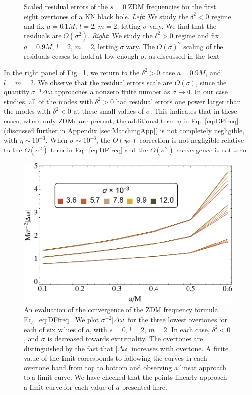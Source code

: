 \begin{refsection}
\begin{figure}[tb]
\vspace{-5mm}
\caption{Scaled residual errors of the $s=0$ ZDM frequencies for the first eight overtones of a KN black hole. 
{\it Left}: We study the $\delta^2<0$ regime and fix $a  = 0.1 M$, $l=2$, $m =2$, letting $\sigma$ vary. We find that the residuals are $O(\sigma^2)$. {\it Right}: We study the $\delta^2>0$ regime and fix $a  = 0.9 M$, $l=2$, $m =2$, letting $\sigma$ vary. The $O(\sigma)^2$ scaling of the residuals ceases to hold at low enough $\sigma$, as discussed in the text.}
\label{fig:DFsigcon}
\end{figure}

In the right panel of Fig.~\ref{fig:DFsigcon}, we return to the $\delta^2 >0$ case $a=0.9 M$, and $l = m =2$. 
We observe that the residual errors scale are $O(\sigma)$, since the quantity $\sigma^{-1}\Delta \omega$ approaches a nonzero finite number as $\sigma \to 0$.  
In our case studies, all of the modes with $\delta^2 >0$ had residual errors one power larger than the modes with $\delta^2 < 0$ at these small values of $\sigma$.
This indicates that in these cases, where only ZDMs are present, the additional term $\eta$ in Eq.~\eqref{eq:DFfreq} (discussed further in Appendix \ref{sec:MatchingApp}) is not completely negligible, with $\eta \sim 10^{-3}$.
When $\sigma \sim 10^{-3}$, the $O(\eta\sigma)$ correction is not negligible relative to the $O(\sigma^2)$ term in  Eq.~\eqref{eq:DFfreq} and the $O(\sigma^2)$ convergence is not seen.

\begin{figure}[tb]
\includegraphics[width =1.0 \columnwidth]{chapter_extremal/etc/sigmaconvergence}
\caption{An evaluation of the convergence of the ZDM frequency formula Eq.~\eqref{eq:DFfreq}. We plot $\sigma^{-2}|\Delta\omega|$ for the three lowest overtones for each of six values of $a$, with $s=0$, $l=2$, $m=2$. In each case, $\delta^2<0$, and $\sigma$ is decreased towards extremality. The overtones are distinguished by the fact that $|\Delta\omega|$ increases with overtone. A finite value of the limit corresponds to following the curves in each overtone band from top to bottom and observing a linear approach to a limit curve. We have checked that the points linearly approach a limit curve for each value of $a$ presented here.}
\label{fig:errscale}
\end{figure}


\end{refsection}
